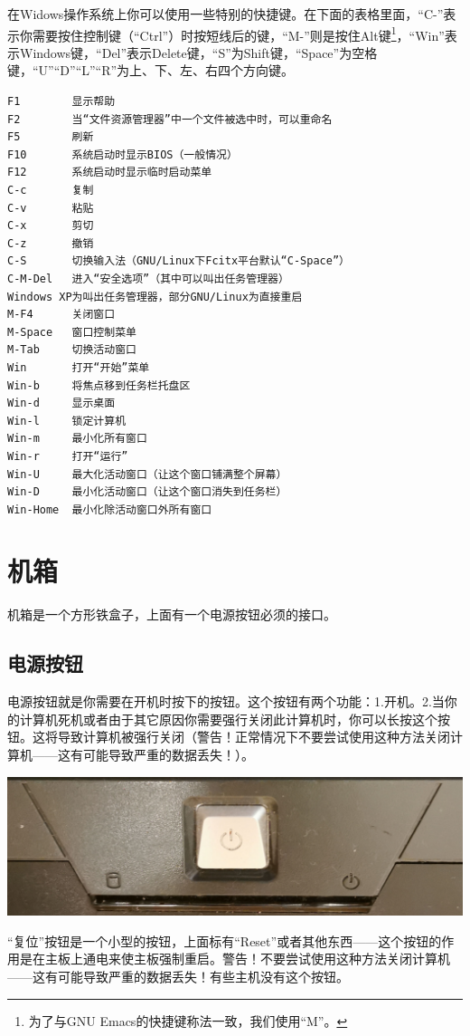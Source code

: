 在Widows操作系统上你可以使用一些特别的快捷键。在下面的表格里面，“C-”表示你需要按住控制键（“Ctrl”）时按短线后的键，“M-”则是按住Alt键\footnote{为了与GNU Emacs的快捷键称法一致，我们使用“M”。}，“Win”表示Windows键，“Del”表示Delete键，“S”为Shift键，“Space”为空格键，“U”“D”“L”“R”为上、下、左、右四个方向键。
\begin{verbatim}
F1        显示帮助
F2        当“文件资源管理器”中一个文件被选中时，可以重命名
F5        刷新
F10       系统启动时显示BIOS（一般情况）
F12       系统启动时显示临时启动菜单
C-c       复制
C-v       粘贴
C-x       剪切
C-z       撤销
C-S       切换输入法（GNU/Linux下Fcitx平台默认“C-Space”）
C-M-Del   进入“安全选项”（其中可以叫出任务管理器）
Windows XP为叫出任务管理器，部分GNU/Linux为直接重启
M-F4      关闭窗口
M-Space   窗口控制菜单
M-Tab     切换活动窗口
Win       打开“开始”菜单
Win-b     将焦点移到任务栏托盘区
Win-d     显示桌面
Win-l     锁定计算机
Win-m     最小化所有窗口
Win-r     打开“运行”
Win-U     最大化活动窗口（让这个窗口铺满整个屏幕）
Win-D     最小化活动窗口（让这个窗口消失到任务栏）
Win-Home  最小化除活动窗口外所有窗口
\end{verbatim}
\section{机箱}
机箱是一个方形铁盒子，上面有一个电源按钮必须的接口。
\subsection{电源按钮}
电源按钮就是你需要在开机时按下的按钮。这个按钮有两个功能：1.开机。2.当你的计算机死机或者由于其它原因你需要强行关闭此计算机时，你可以长按这个按钮。这将导致计算机被强行关闭（{\color{red}警告！正常情况下不要尝试使用这种方法关闭计算机——这有可能导致严重的数据丢失！}）。
\begin{center}
	\includegraphics[width=0.7\linewidth]{pic/StB}
\end{center}\par
“复位”按钮是一个小型的按钮，上面标有“Reset”或者其他东西——这个按钮的作用是在主板上通电来使主板强制重启。{\color{red}警告！不要尝试使用这种方法关闭计算机——这有可能导致严重的数据丢失！}有些主机没有这个按钮。
